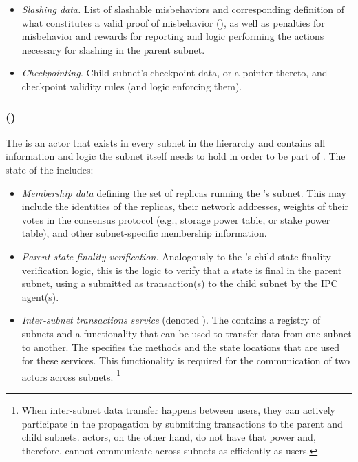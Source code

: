 \begin{itemize}
        \item \emph{Slashing data.} List of slashable misbehaviors and corresponding definition of what constitutes a valid proof of misbehavior (\pom), as well as penalties for misbehavior and rewards for reporting \pom and logic performing the actions necessary for slashing in the parent subnet.
        \item \emph{Checkpointing.} Child subnet's checkpoint data, or a pointer thereto, and checkpoint validity rules (and logic enforcing them).
    \end{itemize}

\subsubsection{\gwFull (\gw)}
    The \gw is an actor that exists in every subnet in the \ipc hierarchy and contains all information and logic the subnet itself needs to hold in order to be part of \ipc. The state of the \gw includes:
    \begin{itemize}
        \item
        \emph{Membership data} defining the set of replicas running the \gw's subnet.
        This may include the identities of the replicas, their network addresses, weights of their votes in the consensus protocol (e.g., storage power table, or stake power table), and other subnet-specific membership information.

        \item \emph{Parent state finality verification.} Analogously to the \sa's child state finality verification logic,
        this is the logic to verify that a state is final in the parent subnet,
        using a \pof submitted as transaction(s) to the child subnet by the IPC agent(s).
        \item \emph{Inter-subnet transactions service} (denoted \postoffice). 
        The \gw contains a registry of subnets and a functionality that can be used to transfer data from one subnet to another. 
        The \postoffice specifies the methods and the state locations that are used for these services.
        This functionality is required for the communication of two actors across subnets.%
\footnote{When inter-subnet data transfer happens between users, they can actively participate in the propagation by submitting transactions to the parent and child subnets. actors, on the other hand, do not have that power and, therefore, cannot communicate across subnets as efficiently as users.}
    \end{itemize}

